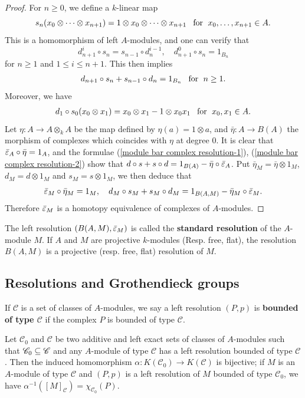 \begin{proof}
For $n\geq 0$, we define a $k$-linear map
\[s_n(x_0\otimes\cdots\otimes x_{n+1})=1\otimes x_0\otimes\cdots\otimes x_{n+1}\hspace{8pt}\text{for}\hspace{6pt} x_0,\dots,x_{n+1}\in A.\]
This is a homomorphism of left $A$-modules, and one can verify that 
\[d_{n+1}^i\circ s_n=s_{n-1}\circ d_n^{i-1},\quad d_{n+1}^0\circ s_n=1_{B_n}\]
for $n\geq 1$ and $1\leq i\leq n+1$. This then implies
\begin{align}\label{module bar complex resolution-1}
d_{n+1}\circ s_n+s_{n-1}\circ d_n=1_{B_n}\hspace{8pt}\text{for}\hspace{6pt} n\geq 1.
\end{align}
Moreover, we have
\begin{align}\label{module bar complex resolution-2}
d_1\circ s_0(x_0\otimes x_1)=x_0\otimes x_1-1\otimes x_0x_1\hspace{8pt}\text{for}\hspace{6pt} x_0,x_1\in A.
\end{align}
Let $\eta:A\to A\otimes_kA$ be the map defined by $\eta(a)=1\otimes a$, and $\bar{\eta}:A\to B(A)$ the morphism of complexes which coincides with $\eta$ at degree $0$. It is clear that $\bar{\varepsilon}_A\circ\bar{\eta}=1_A$, and the formulae (\ref{module bar complex resolution-1}), (\ref{module bar complex resolution-2}) show that $d\circ s+s\circ d=1_{B(A)}-\bar{\eta}\circ\bar{\varepsilon}_A$. Put $\bar{\eta}_M=\bar{\eta}\otimes 1_M$, $d_M=d\otimes 1_M$ and $s_M=s\otimes 1_M$, we then deduce that
\[\bar{\varepsilon}_M\circ\bar{\eta}_M=1_M,\quad d_M\circ s_M+s_M\circ d_M=1_{B(A,M)}-\bar{\eta}_M\circ\bar{\varepsilon}_M.\]
Therefore $\bar{\varepsilon}_M$ is a homotopy equivalence of complexes of $A$-modules.
\end{proof}
The left resolution $(B(A,M),\bar{\varepsilon}_M)$ is called the \textbf{standard resolution} of the $A$-module $M$. If $A$ and $M$ are projective $k$-modules (Resp. free, flat), the resolution $B(A,M)$ is a projective (resp. free, flat) resolution of $M$.
\subsection{Resolutions and Grothendieck groups}
If $\mathscr{C}$ is a set of classes of $A$-modules, we say a left resolution $(P,p)$ is \textbf{bounded of type $\mathscr{C}$} if the complex $P$ is bounded of type $\mathscr{C}$.
\begin{theorem}
Let $\mathscr{C}_0$ and $\mathscr{C}$ be two additive and left exact sets of classes of $A$-modules such that $\mathscr{C}_0\subseteq\mathscr{C}$ and any $A$-module of type $\mathscr{C}$ has a left resolution bounded of type $\mathscr{C}$. Then the induced homomorphism $\alpha:K(\mathscr{C}_0)\to K(\mathscr{C})$ is bijective; if $M$ is an $A$-module of type $\mathscr{C}$ and $(P,p)$ is a left resolution of $M$ bounded of type $\mathscr{C}_0$, we have $\alpha^{-1}([M]_{\mathscr{C}})=\chi_{\mathscr{C}_0}(P)$.
\end{theorem}
